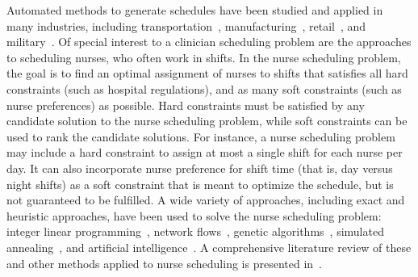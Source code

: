 Automated methods to generate schedules have been studied and applied in many
industries, including
transportation~\cite{aickelin_improved_2006, goel_truck_2012, gunther_combined_2010},
manufacturing~\cite{al-yakoob_mixed-integer_2007, al-yakoob_column_2008, alfares_simulation_2007},
retail~\cite{chapados_retail_2011, nissen_automatic_2010}, and
military~\cite{horn_scheduling_2007, laguna_modeling_2005}.
Of special interest to a clinician scheduling
problem are the approaches to scheduling nurses, who often work in shifts. In the
nurse scheduling problem, the goal is to find an optimal assignment of nurses to
shifts that satisfies all hard constraints (such as hospital regulations),
and as many soft constraints (such as nurse preferences) as possible.
Hard constraints must be satisfied by any candidate solution to the nurse scheduling problem,
while soft constraints can be used to rank the candidate solutions. 
For instance, a nurse scheduling problem may include a hard constraint to assign
at most a single shift for each nurse per day. It can also incorporate 
nurse preference for shift time (that is, day versus night shifts) as a soft constraint
that is meant to optimize the schedule, but is not guaranteed to be fulfilled.
A wide variety of approaches, including exact and heuristic approaches, have been
used to solve the nurse scheduling problem:
integer linear programming~\cite{azaiez_0-1_2005, trilling_nurse_2006, widyastiti_nurses_2016},
network flows~\cite{el_adoly_new_2018},
genetic algorithms~\cite{aickelin_exploiting_2000, jan_evolutionary_2000, kawanaka_genetic_2001},
simulated annealing~\cite{jaszkiewicz_metaheuristic_1997}, and
artificial intelligence~\cite{abdennadher_nurse_1999, li_hybrid_2003}.
A comprehensive
literature review of these and other methods applied to nurse scheduling is
presented in~\cite{burke_state_2004}.



